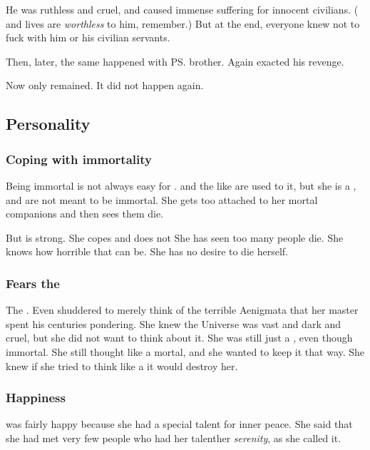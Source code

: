 He was ruthless and cruel, and caused immense suffering for innocent civilians. 
(\Resphan{} and \human{} lives are \emph{worthless} to him, remember.) 
But at the end, everyone knew not to fuck with him or his civilian servants. 

Then, later, the same happened with \ps{\Criseis} brother. 
Again \Ishnaruchaefir{} exacted his revenge. 

Now only \Criseis{} remained. 
It did not happen again. 









\subsection{Personality}





\subsubsection{Coping with immortality}
Being immortal is not always easy for \Criseis. 
\Dragons{} and the like are used to it, but she is a \scatha, and \scathae{} are not meant to be immortal. 
She gets too attached to her mortal companions and then sees them die. 

But \Criseis{} is strong. 
She copes and does not 
She has seen too many people die. 
She knows how horrible that can be. 
She has no desire to die herself. 





\subsubsection{Fears the \dragons}
The \dragons {}. 
Even \Criseis shuddered to merely think of the terrible Aenigmata that her master spent his centuries pondering.
She knew the Universe was vast and dark and cruel, but she did not want to think about it.
She was still just a \scatha, even though immortal.
She still thought like a mortal, and she wanted to keep it that way.
She knew if she tried to think like a \dragon it would destroy her.





\subsubsection{Happiness}
\Criseis was fairly happy because she had a special talent for inner peace. 
She said that she had met very few people who had her talent\dash her \emph{serenity}, as she called it.

